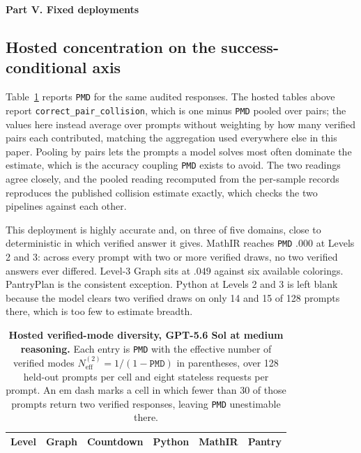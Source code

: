 \documentclass{article}
\newcommand{\1}{\mathbf 1}
\newcommand{\pmd}{\texttt{PMD}}
\newcommand{\neff}{\ensuremath{N^{(2)}_{\mathrm{eff}}}}
\theoremstyle{remark}
\theoremstyle{definition}
\theoremstyle{plain}
\begin{document}



\clearpage

\clearpage
{}
\begin{center}\large\textbf{Part V. Fixed deployments}\end{center}



\subsection{Hosted concentration on the success-conditional axis}
\label{app:hosted-mode-diversity}

Table~\ref{tab:hosted-mode-diversity} reports \pmd{} for the same audited
responses. The hosted tables above report \texttt{correct\_pair\_collision},
which is one minus \pmd{} pooled over pairs; the values here instead average
over prompts without weighting by how many verified pairs each contributed,
matching the aggregation used everywhere else in this paper. Pooling by pairs
lets the prompts a model solves most often dominate the estimate, which is the
accuracy coupling \pmd{} exists to avoid. The two readings agree closely,
and the pooled reading recomputed from the per-sample records reproduces the
published collision estimate exactly, which checks the two pipelines against
each other.

This deployment is highly accurate and, on three of five domains, close to
deterministic in which verified answer it gives. MathIR reaches \pmd{} $.000$
at Levels 2 and 3: across every prompt with two or more verified draws, no two
verified answers ever differed. Level-3 Graph sits at $.049$ against six
available colorings. PantryPlan is the consistent exception. Python at Levels 2
and 3 is left blank because the model clears two verified draws on only 14 and
15 of 128 prompts there, which is too few to estimate breadth.

\begin{table}[!htbp]
  \centering
  \caption{\textbf{Hosted verified-mode diversity, GPT-5.6 Sol at medium
  reasoning.} Each entry is \pmd{} with the effective number of verified modes
  $\neff=1/(1-\pmd{})$ in parentheses, over 128 held-out prompts per cell and
  eight stateless requests per prompt. An em dash marks a cell in which fewer
  than 30 of those prompts return two verified responses, leaving \pmd{}
  unestimable there.}
  \label{tab:hosted-mode-diversity}
  \small
  \begin{tabular}{lccccc}
    \toprule
    Level & Graph & Countdown & Python & MathIR & Pantry \\
    \midrule
    
  \end{tabular}
\end{table}
\end{document}
